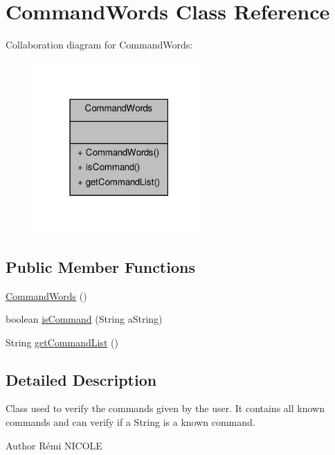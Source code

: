 \hypertarget{classCommandWords}{\section{Command\-Words Class Reference}
\label{classCommandWords}
}


Collaboration diagram for Command\-Words\-:\nopagebreak
\begin{figure}[H]
\begin{center}
\leavevmode
\includegraphics[width=186pt]{classCommandWords__coll__graph}
\end{center}
\end{figure}
\subsection*{Public Member Functions}
\begin{DoxyCompactItemize}
\item 
\hyperlink{classCommandWords_a2d8c096723adb3f822cc001bccd92ed7}{Command\-Words} ()
\item 
boolean \hyperlink{classCommandWords_a98619d278b3fa23fed18b5834f9d20a8}{is\-Command} (String a\-String)
\item 
String \hyperlink{classCommandWords_aa26f54985e39543739e0ae291dcdb8f1}{get\-Command\-List} ()
\end{DoxyCompactItemize}


\subsection{Detailed Description}
Class used to verify the commands given by the user. It contains all known commands and can verify if a String is a known command.

\begin{DoxyAuthor}{Author}
Rémi N\-I\-C\-O\-L\-E 
\end{DoxyAuthor}



